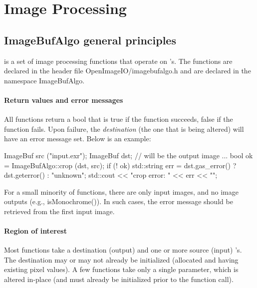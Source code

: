 \chapter{Image Processing}
\label{chap:imagebufalgo}


\section{ImageBufAlgo general principles}
\label{sec:iba:intro}

\IBA is a set of image processing functions that operate on \ImageBuf's.
The functions are declared in the header file 
{\cf OpenImageIO/imagebufalgo.h} and are declared in
the {\cf namespace ImageBufAlgo}.



\subsubsection*{Return values and error messages}

All \IBA functions return a {\cf bool} that is {\cf true} if the
function succeeds, {\cf false} if the function fails.  Upon failure,
the \emph{destination} \ImageBuf (the one that is being altered) will
have an error message set.  Below is an example:

\begin{code}
    ImageBuf src ("input.exr");
    ImageBuf dst;   // will be the output image
    ...
    bool ok = ImageBufAlgo::crop (dst, src);
    if (! ok) {
        std::string err = dst.gas_error() ? dst.geterror() : "unknown";
        std::cout << "crop error: " << err << "\n";
    }
\end{code}

For a small minority of \IBA functions, there are only input images, and
no image outputs (e.g., {\cf isMonochrome()}).  In such cases, the error
message should be retrieved from the first input image.

\subsubsection*{Region of interest}

Most \IBA functions take a destination (output) \ImageBuf and one or
more source (input) \ImageBuf's.  The destination \ImageBuf may or may
not already be initialized (allocated and having existing pixel values).
A few \IBA functions take only a single \ImageBuf parameter, which
is altered in-place (and must already be initialized prior to the 
function call).

